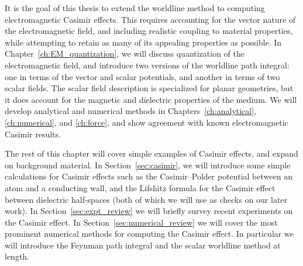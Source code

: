 It is the goal of this thesis to extend the worldline method to computing electromagnetic Casimir effects.
This requires accounting for the vector nature of the electromagnetic field, and including realistic coupling to 
material properties, while attempting to retain as many of its appealing properties as possible.    
In Chapter~\ref{ch:EM_quantization}, we will discuss quantization of the electromagnetic field, and introduce
two versions of the worldline path integral: one in terms of the vector and scalar potentials, and another 
in terms of two scalar fields.  The scalar field description is specialized for planar geometries, 
but it does account for the magnetic and dielectric properties of the medium.
We will develop analytical and numerical methods in Chapters~\ref{ch:analytical}, \ref{ch:numerical},
and \ref{ch:force}, 
and show agreement with known electromagnetic Casimir results.

The rest of this chapter will cover simple examples of Casimir effects, and expand on background material.
In Section~\ref{sec:casimir}, we will introduce some simple calculations for Casimir effects such as
the Casimir--Polder potential between an atom and a conducting wall, and the Lifshitz formula for the Casimir
effect between dielectric half-spaces (both of which we will use as checks on our later work).
In Section~\ref{sec:expt_review} we will briefly survey recent experiments on the Casimir effect.
In Section~\ref{sec:numerical_review} we will cover the most prominent numerical methods for computing the Casimir effect.
In particular we will introduce the Feynman path integral and the scalar worldline method at length.  


